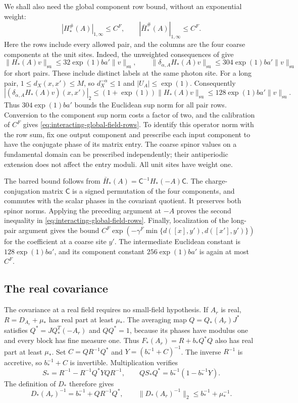 \documentclass[11pt,letterpaper,reqno]{amsart}
\begin{document}
We shall also need the global component row
bound, without an exponential weight:
\begin{equation}\label{eq:interacting-global-field-rows}
 |H_*^\#(A)|_{1,\infty}\le C^F,\qquad
 |\bar H_*^\#(A)|_{1,\infty}\le C^F .
\end{equation}
Here the rows include every allowed pair, and
the columns are the four coarse components
at the unit sites. Indeed, the unweighted
consequences of \cite[(43)]{FermionBlock}
give
\[
 \|H_*(A)v\|_{\mathrm{su}}
       \le32\exp(1)ba'\|v\|_{\mathrm{su}},\qquad
 \|\delta_{\alpha,A}H_*(A)v\|_{\mathrm{su}}
       \le304\exp(1)ba'\|v\|_{\mathrm{su}}
\]
for short pairs. These include distinct
labels at the same photon site.
For a long pair, $1\le d_X(x,x')\le M$,
so $d_X^{-\alpha}\le1$ and $|U_A|\le\exp(1)$.
Consequently
\[
 |(\delta_{\alpha,A}H_*(A)v)(x,x')|_2
 \le(1+\exp(1))\|H_*(A)v\|_{\mathrm{su}}
 \le128\exp(1)ba'\|v\|_{\mathrm{su}} .
\]
Thus $304\exp(1)ba'$ bounds the Euclidean
sup norm for all pair rows. Conversion to
the component sup norm costs a factor of
two, and the calibration of $C^F$ gives
\eqref{eq:interacting-global-field-rows}.
To identify this operator norm with the row
sum, fix one output component and prescribe
each input component to have the conjugate
phase of its matrix entry. The coarse
spinor values on a fundamental domain can
be prescribed independently; their
antiperiodic extension does not affect
the entry moduli. All unit sites have
weight one.

The barred bound follows from
$\bar H_*(A)=\mathsf C^{-1}H_*(-A)\mathsf C$.
The charge-conjugation matrix $\mathsf C$
is a signed permutation of the four
components, and commutes with the scalar
phases in the covariant quotient. It
preserves both spinor norms. Applying
the preceding argument at $-A$ proves
the second inequality in
\eqref{eq:interacting-global-field-rows}.
Finally, localization of the long-pair
argument gives the bound
$C^F\exp(-\gamma^F\min\{d([x],y'),d([x'],y')\})$
for the coefficient at a coarse site $y'$.
The intermediate Euclidean constant is
$128\exp(1)ba'$, and its component constant
$256\exp(1)ba'$ is again at most $C^F$.

\subsection{The real covariance}
\label{subsec:interacting-covariance}

The covariance at a real field requires no
small-field hypothesis. If $A_r$ is real,
$R=D_{A_r}+\mu_*$ has real part at least $\mu_*$.
The averaging map $Q=Q_*(A_r)J^*$ satisfies
$Q^*=JQ_*^T(-A_r)$ and $QQ^*=1$, because its
phases have modulus one and every block has
fine measure one. Thus $F_*(A_r)=R+b_*Q^*Q$
also has real part at least $\mu_*$.
Set $C=QR^{-1}Q^*$ and $Y=(b_*^{-1}+C)^{-1}$.
The inverse $R^{-1}$ is accretive, so
$b_*^{-1}+C$ is invertible. Multiplication
verifies
\[
 S_*=R^{-1}-R^{-1}Q^*YQR^{-1},\qquad
 Q S_*Q^*=b_*^{-1}(1-b_*^{-1}Y).
\]
The definition of $D_*$ therefore gives
\begin{equation}\label{eq:interacting-coarse-covariance}
 D_*(A_r)^{-1}=b_*^{-1}+QR^{-1}Q^*,\qquad
 \|D_*(A_r)^{-1}\|_2\le b_*^{-1}+\mu_*^{-1}.
\end{equation}
\end{document}
